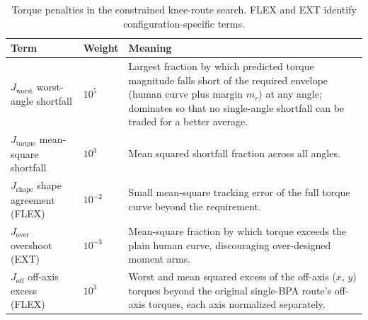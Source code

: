 \begin{table}[htbp]
\caption{Torque penalties in the constrained knee-route search. FLEX and EXT identify configuration-specific terms.}\label{tab:mesh_penalties}
\small\singlespacing
\begin{tabularx}{\textwidth}{@{}p{}p{}X@{}}
\toprule
\textbf{Term} & \textbf{Weight} & \textbf{Meaning} \\
\midrule
$J_{\text{worst}}$ worst-angle shortfall & $10^{5}$ & Largest fraction by which predicted torque magnitude falls short of the required envelope (human curve plus margin $m_{r}$) at any angle; dominates so that no single-angle shortfall can be traded for a better average. \\
$J_{\text{torque}}$ mean-square shortfall & $10^{3}$ & Mean squared shortfall fraction across all angles. \\
$J_{\text{shape}}$ shape agreement (FLEX) & $10^{-2}$ & Small mean-square tracking error of the full torque curve beyond the requirement. \\
$J_{\text{over}}$ overshoot (EXT) & $10^{-3}$ & Mean-square fraction by which torque exceeds the plain human curve, discouraging over-designed moment arms. \\
$J_{\text{off}}$ off-axis excess (FLEX) & $10^{3}$ & Worst and mean squared excess of the off-axis ($x$, $y$) torques beyond the original single-BPA route's off-axis torques, each axis normalized separately. \\
\bottomrule
\end{tabularx}
\end{table}

